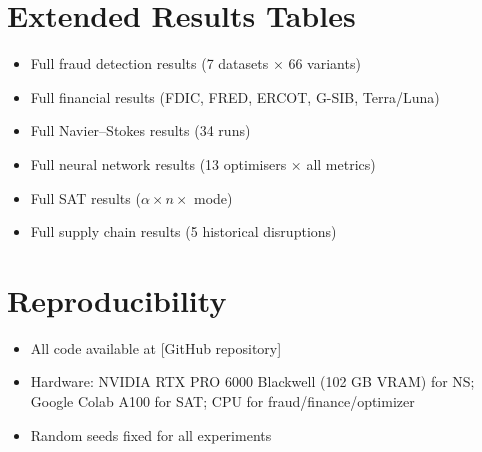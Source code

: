 \documentclass[11pt,a4paper]{article}
\begin{document}
\section{Extended Results Tables}\label{app:tables}
\begin{itemize}[nosep]
  \item Full fraud detection results (7 datasets × 66 variants)
  \item Full financial results (FDIC, FRED, ERCOT, G-SIB, Terra/Luna)
  \item Full Navier--Stokes results (34 runs)
  \item Full neural network results (13 optimisers × all metrics)
  \item Full SAT results ($\alpha \times n \times $ mode)
  \item Full supply chain results (5 historical disruptions)
\end{itemize}

\section{Reproducibility}\label{app:code}
\begin{itemize}[nosep]
  \item All code available at [GitHub repository]
  \item Hardware: NVIDIA RTX PRO 6000 Blackwell (102 GB VRAM) for NS;
        Google Colab A100 for SAT; CPU for fraud/finance/optimizer
  \item Random seeds fixed for all experiments
\end{itemize}


%




\end{document}
